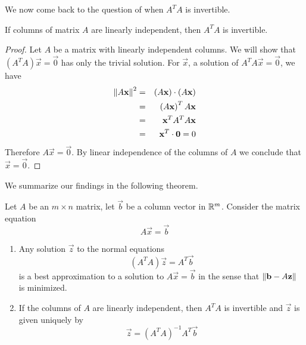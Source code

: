 \documentclass{ximera}
\begin{document}
We now come back to the question of when $A^TA$ is invertible.

\begin{theorem}\label{th:ATAinverse}
If columns of matrix $A$ are linearly independent, then $A^TA$ is invertible.    
\end{theorem}

\begin{proof}
    Let $A$ be a matrix with linearly independent columns.  We will show that $\left(A^TA\right)\vec{x}=\vec{0}$ has only the trivial solution.  For $\vec{x}$, a solution of $A^TA\vec{x}=\vec{0}$, we have
    \begin{eqnarray*}
        \left\lVert A\mathbf{x}\right\rVert^2&=&(A\mathbf{x})\cdot(A\mathbf{x})\\
        &=&\left(A\mathbf{x}\right)^TA\mathbf{x}\\
        &=&\mathbf{x}^TA^TA\mathbf{x}\\
        &=&\mathbf{x}^T\cdot\mathbf{0}=0
    \end{eqnarray*}
    Therefore $A\vec{x}=\vec{0}$.  By linear independence of the columns of $A$ we conclude that $\vec{x}=\vec{0}$.
\end{proof}    

    We summarize our findings in the following theorem.

    \begin{theorem}\label{th:bestApprox}
    Let $A$ be an $m\times n$ matrix, let $\vec{b}$ be a column vector in $\mathbb{R}^m$.  Consider the matrix equation
    $$A\vec{x}=\vec{b}$$
    \begin{enumerate}
        \item Any solution $\vec{z}$ to the normal equations 
        $$\left(A^TA\right)\vec{z}=A^T\vec{b}$$
        is a best approximation to a solution to $A\vec{x}=\vec{b}$ in the sense that $\left\lVert\mathbf{b}-A\mathbf{z}\right\rVert$ is minimized.
        \item If the columns of $A$ are linearly independent, then $A^TA$ is invertible and $\vec{z}$ is given uniquely by 
        $$\vec{z}=\left(A^TA\right)^{-1}A^T\vec{b}$$
    \end{enumerate}
    \end{theorem}
\end{document}

